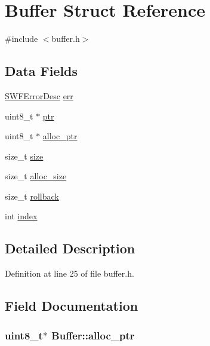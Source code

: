 \hypertarget{struct_buffer}{\section{Buffer Struct Reference}
\label{struct_buffer}
}


{\ttfamily \#include $<$buffer.\-h$>$}

\subsection*{Data Fields}
\begin{DoxyCompactItemize}
\item 
\hyperlink{struct_s_w_f_error_desc}{S\-W\-F\-Error\-Desc} \hyperlink{struct_buffer_a879aecdae33529cd7b68da64db41e5af}{err}
\item 
uint8\-\_\-t $\ast$ \hyperlink{struct_buffer_a31a306e12a70a812149b2eaf22279ea5}{ptr}
\item 
uint8\-\_\-t $\ast$ \hyperlink{struct_buffer_a18c1ecd1f7dc2dbeb5f576aecca97560}{alloc\-\_\-ptr}
\item 
size\-\_\-t \hyperlink{struct_buffer_a24e94f119f4b386771c78cf37aaff41b}{size}
\item 
size\-\_\-t \hyperlink{struct_buffer_a96fe3160d9fc953e060a14b6c2ad52bd}{alloc\-\_\-size}
\item 
size\-\_\-t \hyperlink{struct_buffer_a056d3a336c67135e9c516bc6bd20e6b7}{rollback}
\item 
int \hyperlink{struct_buffer_abb6fa5333fd31327f6c5cb2e56e4a5ae}{index}
\end{DoxyCompactItemize}


\subsection{Detailed Description}


Definition at line 25 of file buffer.\-h.



\subsection{Field Documentation}
\hypertarget{struct_buffer_a18c1ecd1f7dc2dbeb5f576aecca97560}{
\subsubsection[{alloc\-\_\-ptr}]{\setlength{\rightskip}{0pt plus 5cm}uint8\-\_\-t$\ast$ Buffer\-::alloc\-\_\-ptr}}\label{struct_buffer_a18c1ecd1f7dc2dbeb5f576aecca97560}


